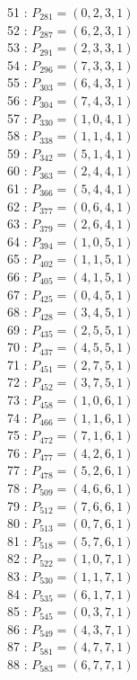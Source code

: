 \documentclass{article}
\begin{document}
{\begin{multicols}{3}
51 : $P_{281}=( 0, 2, 3, 1 )$\\
52 : $P_{287}=( 6, 2, 3, 1 )$\\
53 : $P_{291}=( 2, 3, 3, 1 )$\\
54 : $P_{296}=( 7, 3, 3, 1 )$\\
55 : $P_{303}=( 6, 4, 3, 1 )$\\
56 : $P_{304}=( 7, 4, 3, 1 )$\\
57 : $P_{330}=( 1, 0, 4, 1 )$\\
58 : $P_{338}=( 1, 1, 4, 1 )$\\
59 : $P_{342}=( 5, 1, 4, 1 )$\\
60 : $P_{363}=( 2, 4, 4, 1 )$\\
61 : $P_{366}=( 5, 4, 4, 1 )$\\
62 : $P_{377}=( 0, 6, 4, 1 )$\\
63 : $P_{379}=( 2, 6, 4, 1 )$\\
64 : $P_{394}=( 1, 0, 5, 1 )$\\
65 : $P_{402}=( 1, 1, 5, 1 )$\\
66 : $P_{405}=( 4, 1, 5, 1 )$\\
67 : $P_{425}=( 0, 4, 5, 1 )$\\
68 : $P_{428}=( 3, 4, 5, 1 )$\\
69 : $P_{435}=( 2, 5, 5, 1 )$\\
70 : $P_{437}=( 4, 5, 5, 1 )$\\
71 : $P_{451}=( 2, 7, 5, 1 )$\\
72 : $P_{452}=( 3, 7, 5, 1 )$\\
73 : $P_{458}=( 1, 0, 6, 1 )$\\
74 : $P_{466}=( 1, 1, 6, 1 )$\\
75 : $P_{472}=( 7, 1, 6, 1 )$\\
76 : $P_{477}=( 4, 2, 6, 1 )$\\
77 : $P_{478}=( 5, 2, 6, 1 )$\\
78 : $P_{509}=( 4, 6, 6, 1 )$\\
79 : $P_{512}=( 7, 6, 6, 1 )$\\
80 : $P_{513}=( 0, 7, 6, 1 )$\\
81 : $P_{518}=( 5, 7, 6, 1 )$\\
82 : $P_{522}=( 1, 0, 7, 1 )$\\
83 : $P_{530}=( 1, 1, 7, 1 )$\\
84 : $P_{535}=( 6, 1, 7, 1 )$\\
85 : $P_{545}=( 0, 3, 7, 1 )$\\
86 : $P_{549}=( 4, 3, 7, 1 )$\\
87 : $P_{581}=( 4, 7, 7, 1 )$\\
88 : $P_{583}=( 6, 7, 7, 1 )$\\
\end{multicols}


}
\end{document}
